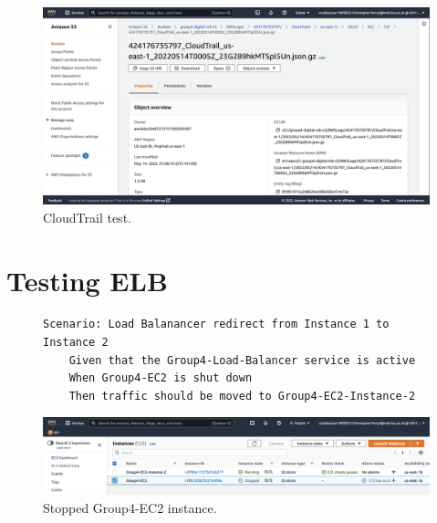 \begin{figure}[!htbp]
    \centering
    \includegraphics[width=\textwidth]{resources/cloudtrail/cloudtrail-test}
    \caption{CloudTrail test.}
    \label{fig:cloudtrail-test-photo}
\end{figure}

\clearpage
\section{Testing ELB}\label{sec:testing-elb}

\begin{figure}[!htbp]
    \centering
    \begin{verbatim}
Scenario: Load Balanancer redirect from Instance 1 to Instance 2
    Given that the Group4-Load-Balancer service is active
    When Group4-EC2 is shut down
    Then traffic should be moved to Group4-EC2-Instance-2
    \end{verbatim}
    \label{fig:elb-test}
\end{figure}

\begin{figure}[!htbp]
    \centering
    \includegraphics[width=\textwidth]{resources/elb/elb-test-stopped-instance}
    \caption{Stopped Group4-EC2 instance.}
    \label{fig:elb-test-stopped-instance}
\end{figure}

